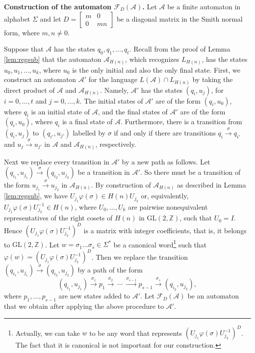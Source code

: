 \documentclass[fontsize=11pt,DIV=13,paper=letter]{scrartcl}
\theoremstyle{definition}
\newcommand{\A}{\mathcal{A}}
\newcommand{\Z}{\mathbb{Z}}
\newcommand{\F}{\mathcal{F}}
\newcommand{\GL}{\mathrm{GL}(2,\Z)}
\renewcommand{\phi}{\varphi}
\begin{document}
{\bf Construction of the automaton $\F_D(\A)$.} Let $\A$ be a finite automaton in alphabet $\Sigma$ and let $D=\begin{bmatrix} m & 0\\ 0 & mn \end{bmatrix}$ be a diagonal matrix in the Smith normal form, where $m,n\neq 0$.

Suppose that $\A$ has the states $q_0,q_1,\dots,q_t$. Recall from the proof of Lemma \ref{lem:regsub} that the automaton $\A_{H(n)}$, which recognizes $L_{H(n)}$, has the states $u_0,u_1,\dots,u_k$, where $u_0$ is the only initial and also the only final state. First, we construct an automaton $\A'$ for the language $L(\A)\cap L_{H(n)}$ by taking the direct product of $\A$ and $\A_{H(n)}$. Namely, $\A'$ has the states $(q_i,u_j)$, for $i=0,\dots,t$ and $j=0,\dots,k$. The initial states of $\A'$ are of the form $(q_i,u_0)$, where $q_i$ is an initial state of $\A$, and the final states of $\A'$ are of the form $(q_i,u_0)$, where $q_i$ is a final state of $\A$. Furthermore, there is a transition from $(q_i,u_j)$ to $(q_{i'},u_{j'})$ labelled by $\sigma$ if and only if there are transitions $q_i\xrightarrow{\sigma} q_{i'}$ and $u_j\xrightarrow{\sigma} u_{j'}$ in $\A$ and $\A_{H(n)}$, respectively.

Next we replace every transition in $\A'$ by a new path as follows. Let $(q_{i_1},u_{j_1}) \xrightarrow{\sigma} (q_{i_2},u_{j_2})$ be a transition in $\A'$. So there must be a transition of the form $u_{j_1} \xrightarrow{\sigma} u_{j_2}$ in $\A_{H(n)}$. By construction of $\A_{H(n)}$ as described in Lemma \ref{lem:regsub}, we have $U_{j_1}\phi(\sigma)\in H(n)U_{j_2}$ or, equivalently, $U^{}_{j_1}\phi(\sigma)U^{-1}_{j_2}\in H(n)$, where $U_0,\dots,U_k$ are pairwise nonequivalent representatives of the right cosets of $H(n)$ in $\GL$, such that $U_0=I$. Hence $(U^{}_{j_1}\phi(\sigma)U^{-1}_{j_2})^D$ is a matrix with integer coefficients, that is, it belongs to $\GL$. Let $w=\sigma_1\dots \sigma_s\in \Sigma^*$ be a canonical word\footnote{Actually, we can take $w$ to be any word that represents $(U^{}_{j_1}\phi(\sigma)U^{-1}_{j_2})^D$. The fact that it is canonical is not important for our construction.} such that $\phi(w)=(U^{}_{j_1}\phi(\sigma)U^{-1}_{j_2})^D$. Then we replace the transition $(q_{i_1},u_{j_1}) \xrightarrow{\sigma} (q_{i_2},u_{j_2})$ by a path of the form
\[
(q_{i_1},u_{j_1}) \xrightarrow{\sigma_1} p_1 \xrightarrow{\sigma_2}\ \cdots\ \xrightarrow{\sigma_{s-1}} p_{s-1} \xrightarrow{\sigma_s} (q_{i_2},u_{j_2}),
\]
where $p_1,\dots,p_{s-1}$ are new states added to $\A'$. Let $\F_D(\A)$ be an automaton that we obtain after applying the above procedure to $\A'$.
\end{document}
